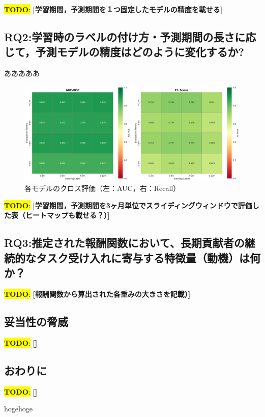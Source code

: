 \documentclass[submit,techrep,noauthor]{ipsj}
\newcommand{\todo}[1]{\colorbox{yellow}{{\bf TODO}:}{\color{red} {\textbf{[#1]}}}}
\begin{document}
\todo{学習期間，予測期間を１つ固定したモデルの精度を載せる}

\subsection{RQ2:学習時のラベルの付け方・予測期間の長さに応じて，予測モデルの精度はどのように変化するか?}
あああああ
\begin{figure}[t]
    \centering
    \includegraphics[width=0.8\linewidth]{./Hashimoto_fig/heatmap_conbined.pdf}
    \caption{各モデルのクロス評価（左：AUC，右：Recall）}
    \label{fig:Approach}
\end{figure}


\todo{学習期間，予測期間を3ヶ月単位でスライディングウィンドウで評価した表（ヒートマップも載せる？）}
\subsection{RQ3:推定された報酬関数において、長期貢献者の継続的なタスク受け入れに寄与する特徴量（動機）は何か？}
\todo{報酬関数から算出された各重みの大きさを記載）}

\subsection{妥当性の脅威}
\todo{}

\subsection{おわりに}
\todo{}

\begin{acknowledgment}
hogehoge
\end{acknowledgment}




\end{document}
